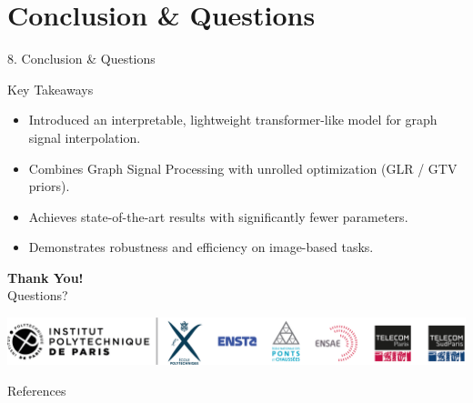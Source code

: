 \documentclass[aspectratio=169,xcolor=dvipsnames]{beamer}
\begin{document}
\section{Conclusion \& Questions}

\begin{frame}{8. Conclusion \& Questions}

    \begin{block}{Key Takeaways}
        \begin{itemize}
            \item Introduced an interpretable, lightweight transformer-like model for graph signal interpolation.
            \item Combines Graph Signal Processing with unrolled optimization (GLR / GTV priors).
            \item Achieves state-of-the-art results with significantly fewer parameters.
            \item Demonstrates robustness and efficiency on image-based tasks.
        \end{itemize}
    \end{block}

    \centering
    \Huge{\textbf{Thank You!}} \\
    \vspace{0.2cm}
    \normalsize Questions?
    \vspace{0.2cm}
    \begin{center}
        \includegraphics[width=0.7\linewidth]{IPP-Horizontal.png}
    \end{center}
\end{frame}

\begin{frame}{References}
    \tiny %
\begin{justify}
\begin{flushleft}
    \begin{multicols}{2}
        
        
    \end{multicols}
\end{flushleft}
\end{justify}
\end{frame}
\end{document}

